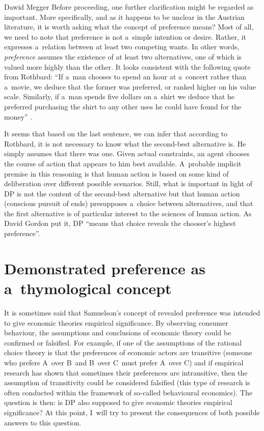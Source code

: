 \begin{artengenv}{Dawid Megger}
Before proceeding, one further clarification might be regarded as important. More specifically, and as it happens to be unclear in the Austrian literature, it is worth asking what the concept of preference means? Most of all, we need to note that preference is not a~simple intention or desire. Rather, it expresses a~relation between at least two competing wants. In other words, \textit{preference} assumes the existence of at least two alternatives, one of which is valued more highly than the other. It looks consistent with the following quote from Rothbard: ``If a~man chooses to spend an hour at a~concert rather than a~movie, we deduce that the former was preferred, or ranked higher on his value scale. Similarly, if a~man spends five dollars on a~shirt we deduce that he preferred purchasing the shirt to any other uses he could have found for the money'' 
\parencite[][p.290]{rothbard_present_2011}.%




It seems that based on the last sentence, we can infer that according to Rothbard, it is not necessary to know what the second-best alternative is. He simply assumes that there was one. Given actual constraints, an agent chooses the course of action that appears to him best available. A~probable implicit premise in this reasoning is that human action is based on some kind of deliberation over different possible scenarios. Still, what is important in light of DP is not the content of the second-best alternative but that human action (conscious pursuit of ends) presupposes a~choice between alternatives, and that the first alternative is of particular interest to the sciences of human action. As David Gordon 
\parencite*[][]{gordon_misunderstanding_2022} %
 put it, DP ``means that choice reveals the chooser's highest preference''.



\section{Demonstrated preference as a~thymological concept}

It is sometimes said that Samuelson's concept of revealed preference was intended to give economic theories empirical significance. By observing consumer behaviour, the assumptions and conclusions of economic theory could be confirmed or falsified. For example, if one of the assumptions of the rational choice theory is that the preferences of economic actors are transitive (someone who prefers A~over B~and B~over C~must prefer A~over C) and if empirical research has shown that sometimes their preferences are intransitive, then the assumption of transitivity could be considered falsified (this type of research is often conducted within the framework of so-called behavioural economics). The question is then: is DP also supposed to give economic theories empirical significance? At this point, I~will try to present the consequences of both possible answers to this question.




\end{artengenv}
